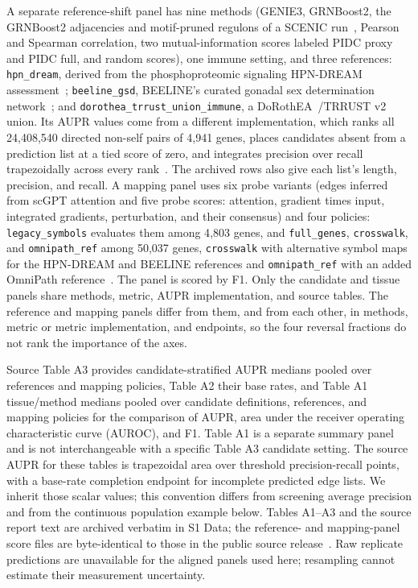 \documentclass[10pt,letterpaper]{article}
\begin{document}
A separate reference-shift panel has nine methods (GENIE3, GRNBoost2, the GRNBoost2 adjacencies and motif-pruned regulons of a SCENIC run~\cite{aibar2017scenic}, Pearson and Spearman correlation, two mutual-information scores labeled PIDC proxy and PIDC full, and random scores), one immune setting, and three references: \texttt{hpn\_dream}, derived from the phosphoproteomic signaling HPN-DREAM assessment~\cite{hill2016hpndream}; \texttt{beeline\_gsd}, BEELINE's curated gonadal sex determination network~\cite{pratapa2020beeline}; and \texttt{dorothea\_trrust\_union\_immune}, a DoRothEA~\cite{garciaalonso2019dorothea}/TRRUST v2~\cite{han2018trrust} union. Its AUPR values come from a different implementation, which ranks all 24{,}408{,}540 directed non-self pairs of 4{,}941 genes, places candidates absent from a prediction list at a tied score of zero, and integrates precision over recall trapezoidally across every rank~\cite{boyd2013aucpr}. The archived rows also give each list's length, precision, and recall. A mapping panel uses six probe variants (edges inferred from scGPT attention and five probe scores: attention, gradient times input, integrated gradients, perturbation, and their consensus) and four policies: \texttt{legacy\_symbols} evaluates them among 4{,}803 genes, and \texttt{full\_genes}, \texttt{crosswalk}, and \texttt{omnipath\_ref} among 50{,}037 genes, \texttt{crosswalk} with alternative symbol maps for the HPN-DREAM and BEELINE references and \texttt{omnipath\_ref} with an added OmniPath reference~\cite{turei2021omnipath}. The panel is scored by F1. Only the candidate and tissue panels share methods, metric, AUPR implementation, and source tables. The reference and mapping panels differ from them, and from each other, in methods, metric or metric implementation, and endpoints, so the four reversal fractions do not rank the importance of the axes.

Source Table A3 provides candidate-stratified AUPR medians pooled over references and mapping policies, Table A2 their base rates, and Table A1 tissue/method medians pooled over candidate definitions, references, and mapping policies for the comparison of AUPR, area under the receiver operating characteristic curve (AUROC), and F1. Table A1 is a separate summary panel and is not interchangeable with a specific Table A3 candidate setting. The source AUPR for these tables is trapezoidal area over threshold precision-recall points, with a base-rate completion endpoint for incomplete predicted edge lists. We inherit those scalar values; this convention differs from screening average precision and from the continuous population example below. Tables A1--A3 and the source report text are archived verbatim in S1 Data; the reference- and mapping-panel score files are byte-identical to those in the public source release~\cite{kendiukhov2026evalrelease}. Raw replicate predictions are unavailable for the aligned panels used here; resampling cannot estimate their measurement uncertainty.
\end{document}
